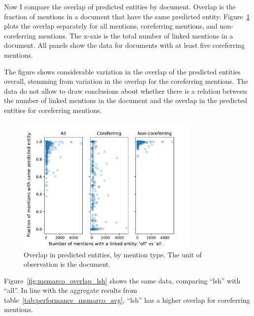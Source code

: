 \documentclass[a4paper,11pt]{article}
\numberwithin{equation}{section} %
\begin{document}
Now I compare the overlap of predicted entities by document. Overlap is the fraction of mentions in a document that have the same predicted entity. 
Figure~\ref{fig:msmarco_overlap_off} plots the overlap separately for all mentions, coreferring mentions, and non-coreferring mentions. The x-axis is the total number of linked mentions in a document.
All panels show the data for documents with at least five coreferring mentions.

The figure shows considerable variation in the overlap of the predicted entities overall, stemming from variation in the overlap for the coreferring mentions. The data do not allow to draw conclusions about whether there is a relation between the number of linked mentions in the document and the overlap in the predicted entities for coreferring mentions.

\begin{figure}[H]
  \centering
  \includegraphics[width = 0.8\textwidth]{../figs/msmarco_overlap_off.pdf}
  \caption{Overlap in predicted entities, by mention type. The unit of observation is the document.}
  \label{fig:msmarco_overlap_off}
\end{figure}


Figure~\ref{fig:msmarco_overlap_lsh} shows the same data, comparing ``lsh'' with ``all''. In line with the aggregate results from table~\ref{tab:performance_msmarco_avg}, ``lsh'' has a higher overlap for coreferring mentions.
\end{document}
